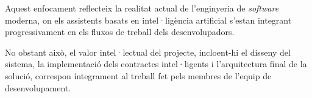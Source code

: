 Aquest enfocament reflecteix la realitat actual de l'enginyeria de \textit{software} moderna, on els assistents basats en
intel·ligència artificial s'estan integrant progressivament en els fluxos de treball dels desenvolupadors.

No obstant això, el valor intel·lectual del projecte, incloent-hi el disseny del sistema, la implementació dels
contractes intel·ligents i l'arquitectura final de la solució, correspon íntegrament al treball fet pels membres de
l'equip de desenvolupament.